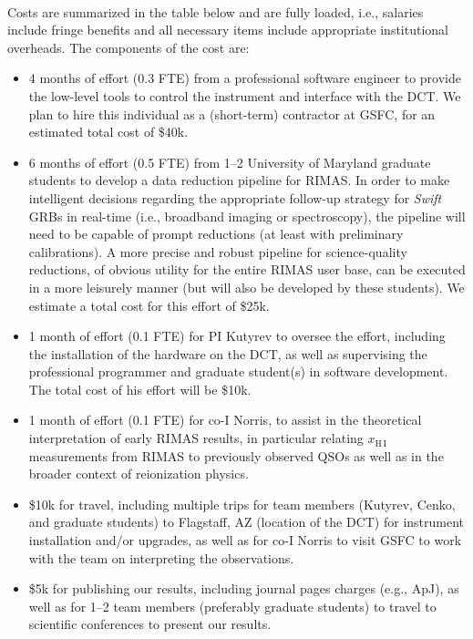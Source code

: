 \documentclass[letterpaper,11pt]{article}
\newcommand{\apj}{ApJ}%
\begin{document}
\clearpage

\smallskip\\
Costs are summarized in the table below and are fully loaded, i.e., salaries include
fringe benefits and all necessary items include appropriate institutional overheads.
The components of the cost are:
\begin{itemize}
\item 4 months of effort (0.3 FTE) from a professional software engineer to provide
the low-level tools to control the instrument and interface with the DCT.  We plan
to hire this individual as a (short-term) contractor at GSFC, for an estimated total
cost of \$40k.
\item 6 months of effort (0.5 FTE) from 1--2 University of Maryland graduate students
to develop a data reduction pipeline for RIMAS.  In order to make intelligent
decisions regarding the appropriate follow-up strategy for \textit{Swift} GRBs in
real-time (i.e., broadband imaging or spectroscopy), the pipeline will need to be
capable of prompt reductions (at least with preliminary calibrations).  A more 
precise and robust pipeline for science-quality reductions, of obvious utility 
for the entire RIMAS user base, can be executed in a more leisurely manner (but will
also be developed by these students).  We estimate a total cost for this effort 
of \$25k.
\item 1 month of effort (0.1 FTE) for PI Kutyrev to oversee the effort,
including the installation of the hardware on the DCT, as well as supervising the
professional programmer and graduate student(s) in software development.  The 
total cost of his effort will be \$10k.
\item 1 month of effort (0.1 FTE) for co-I Norris, to assist in the theoretical
interpretation of early RIMAS results, in particular relating $x_{\mathrm{H\,I}}$
measurements from RIMAS to previously observed QSOs as well as in the broader 
context of reionization physics.
\item \$10k for travel, including multiple trips for team members (Kutyrev, Cenko,
and graduate students) to Flagstaff, AZ (location of the DCT) for instrument 
installation and/or upgrades, as well as for co-I Norris to visit GSFC to work 
with the team on interpreting the observations.
\item \$5k for publishing our results, including journal pages charges (e.g., \apj),
as well as for 1--2 team members (preferably graduate students) to travel to 
scientific conferences to present our results.
\end{itemize}
\end{document}
